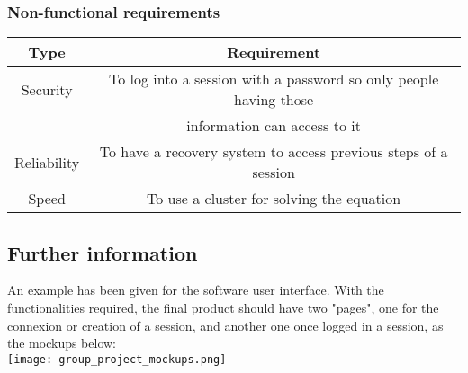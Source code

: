 \documentclass[10pt,a4paper]{report}
\begin{document}
		\subsubsection{Non-functional requirements}
\begin{tabular}{|c|c|}
\hline 
\textbf{Type} & \textbf{Requirement} \\ 
\hline 
Security & To log into a session with a password so only people having those\\
 & information can access to it\\ 
\hline 
Reliability & To have a recovery system to access previous steps of a session \\ 
\hline 
Speed & To use a cluster for solving the equation \\ 
\hline
\end{tabular} 
	\subsection{Further information}
An example has been given for the software user interface. With the functionalities required, the final product should have two "pages", one for the connexion or creation of a session, and another one once logged in a session, as the mockups below:\\
\texttt{[image: group\_project\_mockups.png]}
\end{document}
